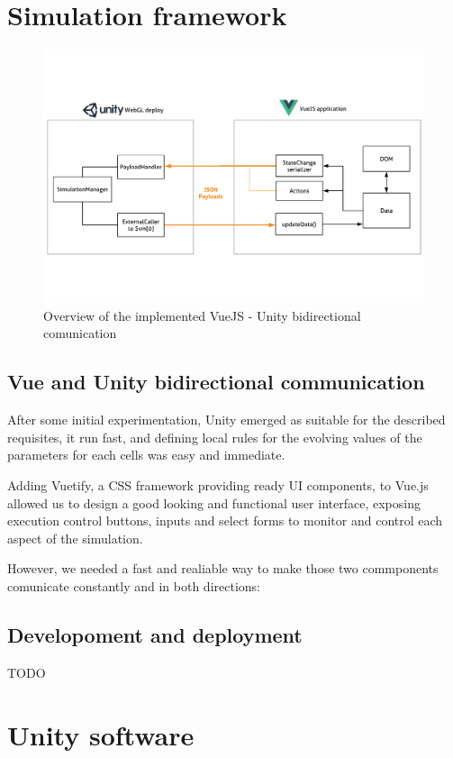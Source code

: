 \section{Simulation framework}
\begin{figure}
  \centering
    \includegraphics[width=1\textwidth]{sw_arch}%
    
  \caption{Overview of the implemented VueJS - Unity bidirectional comunication}
  \label{fig:swstack1}
\end{figure}
\subsection{Vue and Unity bidirectional communication}
After some initial experimentation, Unity emerged as suitable for the described requisites, it run fast, and defining local rules for the evolving values of the parameters for each cells was easy and immediate.

Adding Vuetify, a CSS framework providing ready UI components, to Vue.js allowed us to design a good looking and functional user interface, exposing execution control buttons, inputs and select forms to monitor and control each aspect of the simulation.

However, we needed a fast and realiable way to make those two commponents comunicate constantly and in both directions:


\subsection{Developoment and deployment}
TODO

\section{Unity software}

